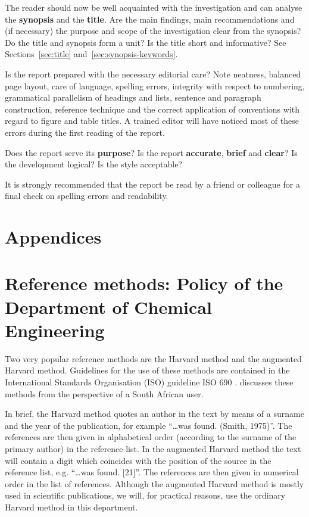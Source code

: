 \documentclass[a5paper, 10pt]{article}
\newcommand{\strongemph}[1]{\textbf{#1}}
\begin{document}
The reader should now be well acquainted with the investigation and
can analyse the \strongemph{synopsis} and the \strongemph{title}.  Are
the main findings, main recommendations and (if necessary) the purpose
and scope of the investigation clear from the synopsis?  Do the title
and synopsis form a unit?  Is the title short and informative?  See
Sections~\ref{sec:title} and~\ref{sec:synopsis-keywords}.

Is the report prepared with the necessary editorial care?  Note
neatness, balanced page layout, care of language, spelling errors,
integrity with respect to numbering, grammatical parallelism of
headings and lists, sentence and paragraph construction, reference
technique and the correct application of conventions with regard to
figure and table titles.  A trained editor will have noticed most of
these errors during the first reading of the report.

Does the report serve its \strongemph{purpose}?  Is the report
\strongemph{accurate}, \strongemph{brief} and \strongemph{clear}?  Is
the development logical?  Is the style acceptable?

It is strongly recommended that the report be read by a friend or
colleague for a final check on spelling errors and readability.




\section{Appendices}
\appendix
\makeatletter
\def\@seccntformat#1{\csname Pref@#1\endcsname \csname the#1\endcsname\quad}
\def\Pref@section{Appendix~}
\makeatother

\section[Reference Methods: Policy of the Department of \\Chemical Engineering]{Reference methods: Policy of the \\Department of Chemical Engineering}
\label{app:reference_methods}
Two very popular reference methods are the Harvard method and the
augmented Harvard method.  Guidelines for the use of these methods are
contained in the International Standards Organisation (ISO) guideline
ISO 690 \citep{ISO690}.  \citet{burger} discusses these methods from
the perspective of a South African user.

In brief, the Harvard method quotes an author in the text by means of
a surname and the year of the publication, for example ``\dots was found.
(Smith, 1975)''.  The references are then given in alphabetical order
(according to the surname of the primary author) in the reference
list.  In the augmented Harvard method the text will contain a digit
which coincides with the position of the source in the reference list,
e.g. ``\dots was found.  [21]''.  The references are then given in
numerical order in the list of references.  Although the augmented
Harvard method is mostly used in scientific publications, we will, for
practical reasons, use the ordinary Harvard method in this department.
\end{document}
